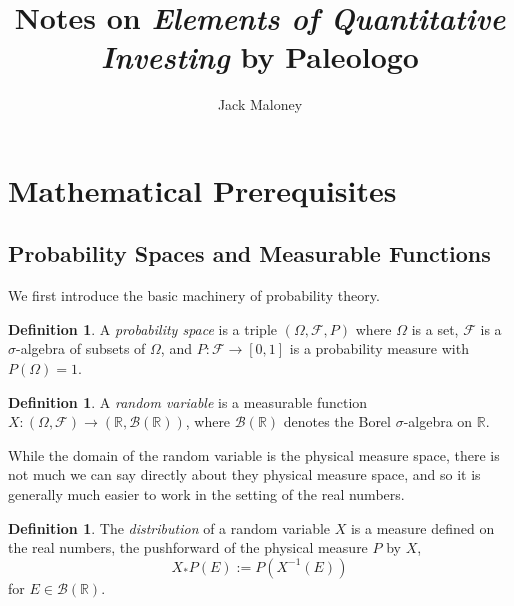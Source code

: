 \documentclass[11pt]{amsart}
\theoremstyle{definition}
\newtheorem{definition}[theorem]{Definition}
\theoremstyle{remark}
\begin{document}
\title{Notes on \textit{Elements of Quantitative Investing} by Paleologo}
\author{Jack Maloney}


\maketitle

\section{Mathematical Prerequisites}

\subsection{Probability Spaces and Measurable Functions}

We first introduce the basic machinery of probability theory.

\begin{definition}
	A \emph{probability space} is a triple $(\Omega, \mathcal{F}, P)$ where $\Omega$ is a set, $\mathcal{F}$ is a $\sigma$-algebra of subsets of $\Omega$, and $P: \mathcal{F} \to [0,1]$ is a probability measure with $P(\Omega) = 1$.
\end{definition}

\begin{definition}
	A \emph{random variable} is a measurable function $X: (\Omega, \mathcal{F}) \to (\mathbb{R}, \mathcal{B}(\mathbb{R}))$, where $\mathcal{B}(\mathbb{R})$ denotes the Borel $\sigma$-algebra on $\mathbb{R}$.
\end{definition}

While the domain of the random variable is the physical measure space, there is not much we can say directly about they physical measure space, and so it is generally much easier to work in the setting of the real numbers.

\begin{definition}
	The \emph{distribution} of a random variable \(X\) is a measure defined on the real numbers, the pushforward of the physical measure \(P\) by \(X\),
	\[
		X_{*}P (E) := P \left( X^{-1}(E) \right)
	\]
	for \(E \in \mathcal{B}(\mathbb{R})\).
\end{definition}
\end{document}
